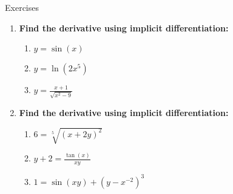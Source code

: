 \documentclass[../revisedMain.tex]{subfiles}
\begin{document}
	\newpage
	\begin{center}
		{\Large Exercises}
	\end{center}
	\begin{enumerate}
		\item\textbf{Find the derivative using implicit differentiation:}
		\begin{enumerate}
			\item $y=\sin(x)$
			\item $y=\ln(2x^5)$
			\item $y=\displaystyle\frac{x+1}{\sqrt{x^2-9}}$
		\end{enumerate}
		\item\textbf{Find the derivative using implicit differentiation:}
		\begin{enumerate}
			\item $6=\sqrt[5]{(x+2y)^2}$
			\item $y+2=\displaystyle\frac{\tan(x)}{xy}$
			\item $1=\sin(xy)+(y-x^{-2})^3$
		\end{enumerate}
	\end{enumerate}
\end{document}
